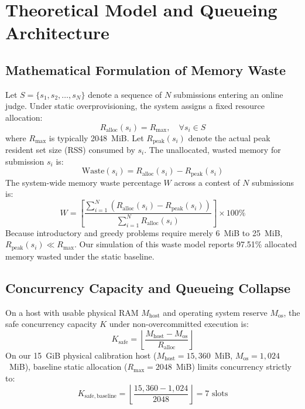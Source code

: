 \documentclass[conference]{IEEEtran}
\begin{document}
\section{Theoretical Model and Queueing Architecture}

\subsection{Mathematical Formulation of Memory Waste}
Let $S = \{s_1, s_2, \dots, s_N\}$ denote a sequence of $N$ submissions entering an online judge. Under static overprovisioning, the system assigns a fixed resource allocation:
\begin{equation}
R_{\mathrm{alloc}}(s_i) = R_{\mathrm{max}}, \quad \forall s_i \in S
\end{equation}
where $R_{\mathrm{max}}$ is typically 2048~MiB. Let $R_{\mathrm{peak}}(s_i)$ denote the actual peak resident set size (RSS) consumed by $s_i$. The unallocated, wasted memory for submission $s_i$ is:
\begin{equation}
\mathrm{Waste}(s_i) = R_{\mathrm{alloc}}(s_i) - R_{\mathrm{peak}}(s_i)
\end{equation}
The system-wide memory waste percentage $W$ across a contest of $N$ submissions is:
\begin{equation}
W = \left[ \frac{\sum_{i=1}^N \left( R_{\mathrm{alloc}}(s_i) - R_{\mathrm{peak}}(s_i) \right)}{\sum_{i=1}^N R_{\mathrm{alloc}}(s_i)} \right] \times 100\%
\end{equation}
Because introductory and greedy problems require merely 6~MiB to 25~MiB, $R_{\mathrm{peak}}(s_i) \ll R_{\mathrm{max}}$. Our simulation of this waste model reports 97.51\% allocated memory wasted under the static baseline.

\subsection{Concurrency Capacity and Queueing Collapse}
On a host with usable physical RAM $M_{\mathrm{host}}$ and operating system reserve $M_{\mathrm{os}}$, the safe concurrency capacity $K$ under non-overcommitted execution is:
\begin{equation}
K_{\mathrm{safe}} = \left\lfloor \frac{M_{\mathrm{host}} - M_{\mathrm{os}}}{R_{\mathrm{alloc}}} \right\rfloor
\end{equation}
On our 15~GiB physical calibration host ($M_{\mathrm{host}} = 15,360$~MiB, $M_{\mathrm{os}} = 1,024$~MiB), baseline static allocation ($R_{\mathrm{max}} = 2048$~MiB) limits concurrency strictly to:
\begin{equation}
K_{\mathrm{safe, baseline}} = \left\lfloor \frac{15,360 - 1,024}{2048} \right\rfloor = 7 \text{ slots}
\end{equation}
\end{document}
